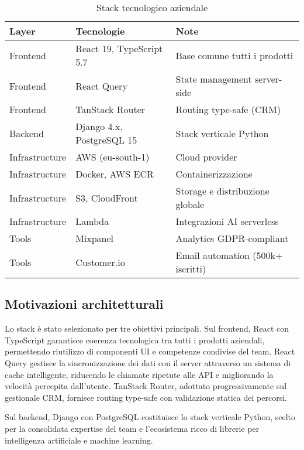 \begin{table}[h]
\centering
\caption{Stack tecnologico aziendale}
\label{tab:stack-aziendale}
\begin{tabular}{|l|l|p{6.5cm}|}
\hline
\textbf{Layer} & \textbf{Tecnologie} & \textbf{Note} \\
\hline
Frontend & React 19, TypeScript 5.7 & Base comune tutti i prodotti \\
\hline
Frontend & React Query & State management server-side \\
\hline
Frontend & TanStack Router & Routing type-safe (CRM) \\
\hline
Backend & Django 4.x, PostgreSQL 15 & Stack verticale Python \\
\hline
Infrastructure & AWS (eu-south-1) & Cloud provider \\
\hline
Infrastructure & Docker, AWS ECR & Containerizzazione \\
\hline
Infrastructure & S3, CloudFront & Storage e distribuzione globale \\
\hline
Infrastructure & Lambda & Integrazioni AI serverless \\
\hline
Tools & Mixpanel & Analytics GDPR-compliant \\
\hline
Tools & Customer.io & Email automation (500k+ iscritti) \\
\hline
\end{tabular}
\end{table}

\subsection{Motivazioni architetturali}

Lo stack è stato selezionato per tre obiettivi principali. Sul frontend, React 
con TypeScript garantisce coerenza tecnologica tra tutti i prodotti aziendali, 
permettendo riutilizzo di componenti UI e competenze condivise del team. React 
Query gestisce la sincronizzazione dei dati con il server attraverso un sistema 
di cache intelligente, riducendo le chiamate ripetute alle API e migliorando la 
velocità percepita dall'utente. TanStack Router, adottato progressivamente sul 
gestionale CRM, fornisce routing type-safe con validazione statica dei percorsi.

Sul backend, Django con PostgreSQL costituisce lo stack verticale Python, 
scelto per la consolidata expertise del team e l'ecosistema ricco di librerie 
per intelligenza artificiale e machine learning.

